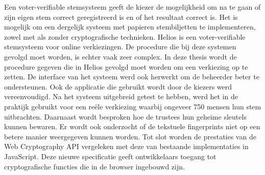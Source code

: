 % 
%

Een voter-verifiable stemsysteem geeft de kiezer de mogelijkheid om na te gaan of zijn eigen stem correct geregistreerd is en of het resultaat correct is. Het is mogelijk om een dergelijk systeem met papieren stembiljetten te implementeren, zowel met als zonder cryptografische technieken. Helios is een voter-verifiable stemsysteem voor online verkiezingen. De procedure die bij deze systemen gevolgd moet worden, is echter vaak zeer complex. In deze thesis wordt de procedure gegeven die in Helios gevolgd moet worden om een verkiezing op te zetten. De interface van het systeem werd ook herwerkt om de beheerder beter te ondersteunen. Ook de applicatie die gebruikt wordt door de kiezers werd vereenvoudigd. Na het systeem uitgebreid getest te hebben, werd het in de praktijk gebruikt voor een re\"ele verkiezing waarbij ongeveer 750 mensen hun stem uitbrachten. Daarnaast wordt besproken hoe de trustees hun geheime sleutels kunnen bewaren. Er wordt ook onderzocht of de tekstuele fingerprints niet op een betere manier weergegeven kunnen worden. Tot slot worden de prestaties van de Web Cryptography API vergeleken met deze van bestaande implementaties in JavaScript. Deze nieuwe specificatie geeft ontwikkelaars toegang tot cryptografische functies die in de browser ingebouwd zijn.